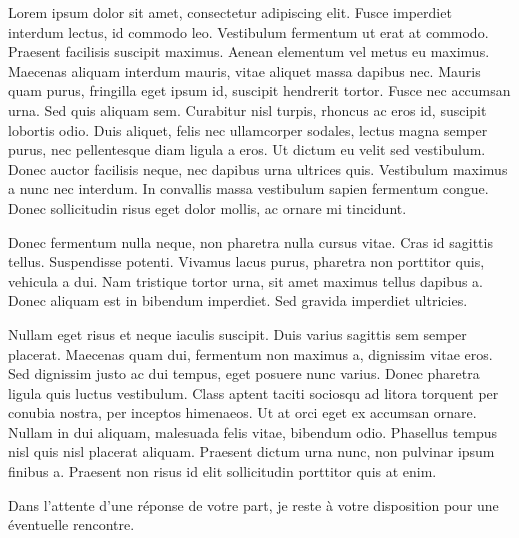 \documentclass[11pt, a4paper]{awesome-cv}
\begin{document}
\makecvheader

\makelettertitle

\begin{cvletter}
 Lorem ipsum dolor sit amet, consectetur adipiscing elit. Fusce imperdiet interdum lectus, id commodo leo. Vestibulum fermentum ut erat at commodo. Praesent facilisis suscipit maximus. Aenean elementum vel metus eu maximus. Maecenas aliquam interdum mauris, vitae aliquet massa dapibus nec. Mauris quam purus, fringilla eget ipsum id, suscipit hendrerit tortor. Fusce nec accumsan urna. Sed quis aliquam sem. Curabitur nisl turpis, rhoncus ac eros id, suscipit lobortis odio. Duis aliquet, felis nec ullamcorper sodales, lectus magna semper purus, nec pellentesque diam ligula a eros. Ut dictum eu velit sed vestibulum. Donec auctor facilisis neque, nec dapibus urna ultrices quis. Vestibulum maximus a nunc nec interdum. In convallis massa vestibulum sapien fermentum congue. Donec sollicitudin risus eget dolor mollis, ac ornare mi tincidunt.

Donec fermentum nulla neque, non pharetra nulla cursus vitae. Cras id sagittis tellus. Suspendisse potenti. Vivamus lacus purus, pharetra non porttitor quis, vehicula a dui. Nam tristique tortor urna, sit amet maximus tellus dapibus a. Donec aliquam est in bibendum imperdiet. Sed gravida imperdiet ultricies.

Nullam eget risus et neque iaculis suscipit. Duis varius sagittis sem semper placerat. Maecenas quam dui, fermentum non maximus a, dignissim vitae eros. Sed dignissim justo ac dui tempus, eget posuere nunc varius. Donec pharetra ligula quis luctus vestibulum. Class aptent taciti sociosqu ad litora torquent per conubia nostra, per inceptos himenaeos. Ut at orci eget ex accumsan ornare. Nullam in dui aliquam, malesuada felis vitae, bibendum odio. Phasellus tempus nisl quis nisl placerat aliquam. Praesent dictum urna nunc, non pulvinar ipsum finibus a. Praesent non risus id elit sollicitudin porttitor quis at enim.

Dans l'attente d'une réponse de votre part, je reste à votre disposition pour une éventuelle rencontre.
\end{cvletter}

\makeletterclosing
\end{document}
